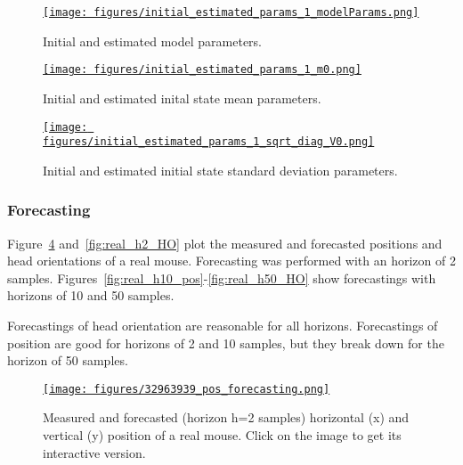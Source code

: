 \documentclass[12pt]{article}
\begin{document}
\begin{figure}
    \centering
    \href{https://www.gatsby.ucl.ac.uk/~rapela/aman/reports/ekfForKinematicsAndHeadOrientation/figures/initial_estimated_params_1_modelParams.html}{\texttt{[image: figures/initial\_estimated\_params\_1\_modelParams.png]}}

    \caption{Initial and estimated model parameters.}

    \label{fig:realData_model_params}
\end{figure}

\begin{figure}
    \centering
    \href{https://www.gatsby.ucl.ac.uk/~rapela/aman/reports/ekfForKinematicsAndHeadOrientation/figures/initial_estimated_params_1_m0.html}{\texttt{[image: figures/initial\_estimated\_params\_1\_m0.png]}}

    \caption{Initial and estimated inital state mean parameters.}

    \label{fig:realData_m0_params}
\end{figure}

\begin{figure}
    \centering
    \href{https://www.gatsby.ucl.ac.uk/~rapela/aman/reports/ekfForKinematicsAndHeadOrientation/figures/initial_estimated_params_1_sqrt_diag_V0.html}{\texttt{[image: figures/initial\_estimated\_params\_1\_sqrt\_diag\_V0.png]}}

    \caption{Initial and estimated initial state standard deviation parameters.}

    \label{fig:realData_sqrt_diag_V0_params}
\end{figure}

\subsubsection*{Forecasting}

Figure~\ref{fig:real_h2_pos} and~\ref{fig:real_h2_HO} plot the measured and
forecasted positions and head orientations of a real mouse. Forecasting was
performed with an horizon of 2 samples.
%
Figures~\ref{fig:real_h10_pos}-\ref{fig:real_h50_HO} show forecastings with
horizons of 10 and 50 samples.

Forecastings of head orientation are reasonable for all horizons. Forecastings
of position are good for horizons of 2 and 10 samples, but they break down for
the horizon of 50 samples.

\begin{figure}
    \centering
    \href{https://www.gatsby.ucl.ac.uk/~rapela/aman/reports/ekfForKinematicsAndHeadOrientation/figures/32963939_pos_forecasting.html}{\texttt{[image: figures/32963939\_pos\_forecasting.png]}}
    \caption{Measured and forecasted (horizon h=2 samples) horizontal (x) and
    vertical (y) position of a real mouse. Click on the image to get its
    interactive version.}
    \label{fig:real_h2_pos}
\end{figure}
\end{document}
